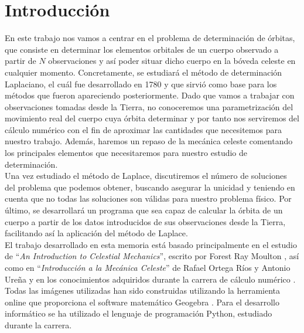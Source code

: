 \documentclass[11pt]{book}
\begin{document}

\thispagestyle{empty}
	\tableofcontents  %
	\thispagestyle{empty}
	\listoffigures    %
	\thispagestyle{empty}


\chapter{Introducción}
\label{chap:introduction}
En este trabajo nos vamos a centrar en el problema de determinación de órbitas, que consiste en determinar los elementos orbitales de un cuerpo observado a partir de $N$ observaciones y así poder situar dicho cuerpo en la bóveda celeste en cualquier momento. Concretamente, se estudiará el método de determinación Laplaciano, el cuál fue desarrollado en 1780 y que sirvió como base para los métodos que fueron apareciendo posteriormente.	Dado que vamos a trabajar con observaciones tomadas desde la Tierra, no conoceremos una parametrización del movimiento real del cuerpo cuya órbita determinar y por tanto nos serviremos del cálculo numérico con el fin de aproximar las cantidades que necesitemos para nuestro trabajo. Además, haremos un repaso de la mecánica celeste comentando los principales elementos que necesitaremos para nuestro estudio de determinación.\\

Una vez estudiado el método de Laplace, discutiremos el número de soluciones del problema que podemos obtener, buscando asegurar la unicidad y teniendo en cuenta que no todas las soluciones son válidas para nuestro problema físico. Por último, se desarrollará un programa que sea capaz de calcular la órbita de un cuerpo a partir de los datos introducidos de sus observaciones desde la Tierra, facilitando así la aplicación del método de Laplace.\\

El trabajo desarrollado en esta memoria está basado principalmente en el estudio de ``\textit{An Introduction to Celestial Mechanics}'', escrito por Forest Ray Moulton \cite{moulton}, así como en ``\textit{Introducción a la Mecánica Celeste}'' de Rafael Ortega Ríos y Antonio Ureña \cite{ortega} y en los conocimientos adquiridos durante la carrera de cálculo numérico \cite{MNII}. Todas las imágenes utilizadas han sido construidas utilizando la herramienta online que proporciona el software matemático Geogebra \cite{geogebra}. Para el desarrollo informático se ha utilizado el lenguaje de programación Python, estudiado durante la carrera.\\
\end{document}
